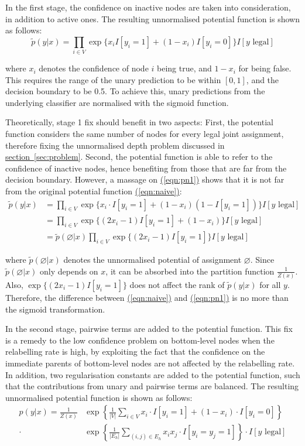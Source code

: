 \documentclass[11pt,a4paper]{article}
\begin{document}
In the first stage, the confidence on inactive nodes are taken into consideration, in addition to active ones. The resulting unnormalised potential function is shown as follows:
\begin{equation}
\tilde{p}(y|x)=\prod_{i\in V}\exp\{x_iI[y_i=1]+(1-x_i)I[y_i=0]\}I[y\text{ legal}]
\label{eqn:pn1}
\end{equation}

where $x_i$ denotes the confidence of node $i$ being true, and $1-x_i$ for being false. This requires the range of the unary prediction to be within $[0,1]$, and the decision boundary to be 0.5. To achieve this, unary predictions from the underlying classifier are normalised with the sigmoid function.

Theoretically, stage 1 fix should benefit in two aspects: First, the potential function considers the same number of nodes for every legal joint assignment, therefore fixing the unnormalised depth problem discussed in \hyperref[sec:problem]{section~\ref{sec:problem}}. Second, the potential function is able to refer to the confidence of inactive nodes, hence benefiting from those that are far from the decision boundary. However, a massage on \hyperref[eqn:pn1]{(\ref{eqn:pn1})} shows that it is not far from the original potential function \hyperref[eqn:naive]{(\ref{eqn:naive})}:
\begin{align}
\tilde{p}(y|x)&=\prod_{i\in V}\exp\{x_i\cdot I[y_i=1]+(1-x_i)(1-I[y_i=1])\}I[y\text{ legal}]\nonumber\\
&=\prod_{i\in V}\exp\{(2x_i-1)I[y_i=1]+(1-x_i)\}I[y\text{ legal}]\nonumber\\
&=\tilde{p}(\varnothing|x)\prod_{i\in V}\exp\{(2x_i-1)I[y_i=1]\}I[y\text{ legal}]
\label{eqn:pn2}
\end{align}

where $\tilde{p}(\varnothing|x)$ denotes the unnormalised potential of assignment $\varnothing$. Since $\tilde{p}(\varnothing|x)$ only depends on $x$, it can be absorbed into the partition function $\frac{1}{Z(x)}$. Also, $\exp\{(2x_i-1)I[y_i=1]\}$ does not affect the rank of $\tilde{p}(y|x)$ for all $y$. Therefore, the difference between \hyperref[eqn:naive]{(\ref{eqn:naive})} and \hyperref[eqn:pn1]{(\ref{eqn:pn1})} is no more than the sigmoid transformation.

In the second stage, pairwise terms are added to the potential function. This fix is a remedy to the low confidence problem on bottom-level nodes when the relabelling rate is high, by exploiting the fact that the confidence on the immediate parents of bottom-level nodes are not affected by the relabelling rate. In addition, two regularisation constants are added to the potential function, such that the contributions from unary and pairwise terms are balanced. The resulting unnormalised potential function is shown as follows:
\begin{align}
p(y|x)=\frac{1}{Z(x)}&\exp\left\{\frac{1}{|V|}\sum_{i\in V}x_i\cdot I[y_i=1]+(1-x_i)\cdot I[y_i=0]\right\}\nonumber\\
\cdot&\exp\left\{\frac{1}{|E_h|}\sum_{(i,j)\in E_h}x_ix_j\cdot I[y_i=y_j=1]\right\}\cdot I[y\text{ legal}]
\end{align}
\end{document}
